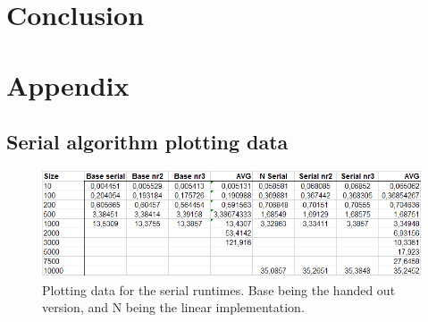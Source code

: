 \documentclass[a4paper,11pt,oneside]{book}
\begin{document}


\chapter{Conclusion}


\newpage
{}
\chapter{Appendix}
\section{Serial algorithm plotting data}

\begin{figure}[H]
  \centering
  \begin{minipage}[b]{0.9\textwidth}
    \includegraphics[width=\textwidth]{plotdata.png}
    \caption{Plotting data for the serial runtimes. Base being the handed out version, and N being the linear implementation.}
  \end{minipage}
\end{figure}
\end{document}
